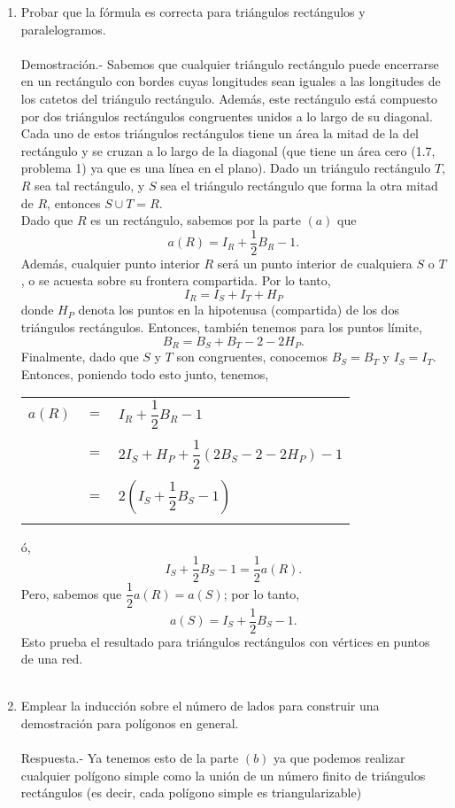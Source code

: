 \begin{enumerate}
\begin{enumerate}[\bfseries (a)]
		\item Probar que la fórmula es correcta para triángulos rectángulos y paralelogramos.\\\\
		Demostración.-\; Sabemos que cualquier triángulo rectángulo puede encerrarse en un rectángulo con bordes cuyas longitudes sean iguales a las longitudes de los catetos del triángulo rectángulo. Además, este rectángulo está compuesto por dos triángulos rectángulos congruentes unidos a lo largo de su diagonal. Cada uno de estos triángulos rectángulos tiene un área la mitad de la del rectángulo y se cruzan a lo largo de la diagonal (que tiene un área cero (1.7, problema 1) ya que es una línea en el plano). Dado un triángulo rectángulo $T$, $R$ sea tal rectángulo, y $S$ sea el triángulo rectángulo que forma la otra mitad de $R$, entonces $S\cup T = R$.\\ 
		Dado que $R$ es un rectángulo, sabemos por la parte $(a)$ que $$a(R)=I_R + \dfrac{1}{2} B_R-1.$$
		Además, cualquier punto interior $R$ será un punto interior de cualquiera $S$ o $T$, o se acuesta sobre su frontera compartida. Por lo tanto, $$I_R = I_S + I_T + H_P$$ donde $H_P$ denota los puntos en la hipotenusa (compartida) de los dos triángulos rectángulos. Entonces, también tenemos para los puntos límite, $$B_R = B_S + B_T - 2 - 2H_P. $$  Finalmente, dado que $S$ y $T$ son congruentes, conocemos $B_S = B_T$ y $I_S = I_T.$ Entonces, poniendo todo esto junto, tenemos,
		\begin{center}	    
		    \begin{tabular}{rcl}
			$a(R)$ & $=$ & $I_R + \dfrac{1}{2} B_R -1$ \\\\
			& $=$ & $2I_S + H_P + \dfrac{1}{2} (2B_S - 2 - 2H_P) - 1 $ \\\\ 
			& $=$ & $2 (I_S + \dfrac{1}{2} B_S - 1)$\\\\
		    \end{tabular}
		\end{center}
		ó, $$I_S + \dfrac{1}{2} B_S - 1 = \dfrac{1}{2} a(R).$$
		Pero, sabemos que $\dfrac{1}{2} a(R) = a (S)$; por lo tanto, $$a(S)= I_S + \dfrac{1}{2} B_S -1.$$
		Esto prueba el resultado para triángulos rectángulos con vértices en puntos de una red.\\\\

		\item Emplear la inducción sobre el número de lados para construir una demostración para polígonos en general.\\\\
		Respuesta.-\; Ya tenemos esto de la parte $(b)$ ya que podemos realizar cualquier polígono simple como la unión de un número finito de triángulos rectángulos (es decir, cada polígono simple es triangularizable)\\\\


\end{enumerate}
\end{enumerate}
